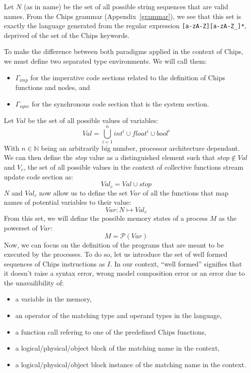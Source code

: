 \documentclass{article}
\begin{document}
Let $N$ (as in name) be the set of all possible string sequences that are valid names. From the Chips grammar (Appendix~\ref{grammar}), we see that this set is exactly the language generated from the regular expression \texttt{[a-zA-Z][a-zA-Z\_]*}, deprived of the set of the Chips keywords.

To make the difference between both paradigms applied in the context of Chips, we must define two separated type environments. We will call them:
\begin{itemize}
    \item $\Gamma_{imp}$ for the imperative code sections related to the definition of Chips functions and nodes, and 
    \item $\Gamma_{sync}$ for the synchronous code section that is the system section.
\end{itemize}

\noindent Let $Val$ be the set of all possible values of variables:
\[
Val = \bigcup_{i=1}^{n} int^{i} \cup float^{i} \cup bool^{i}
\]
With $n \in \mathbb{N}$ being an arbitrarily big number, processor architecture dependant.\\
We can then define the \emph{stop} value as a distinguished element such that $stop \not\in Val$ and $V_c$, the set of all possible values in the context of collective functions stream update code section as:
\[
Val_c = Val \cup stop
\]
$N$ and $Val_c$ now allow us to define the set $Var$ of all the functions that map names of potential variables to their value:
\[
Var: N \mapsto Val_c
\]
From this set, we will define the possible memory states of a process $M$ as the powerset of $Var$:
\[
M = \mathcal{P}(Var)
\]
Now, we can focus on the definition of the programs that are meant to be executed by the processes. To do so, let us introduce the set of well formed sequences of Chips instructions as $I$. In our context, ``well formed'' signifies that it doesn't raise a syntax error, wrong model composition error or an error due to the unavailibility of:
\begin{itemize}
    \item a variable in the memory,
    \item an operator of the matching type and operand types in the language,
    \item a function call refering to one of the predefined Chips functions,
    \item a logical/physical/object block of the matching name in the context,
    \item a logical/physical/object block instance of the matching name in the context.
\end{itemize}
\end{document}
